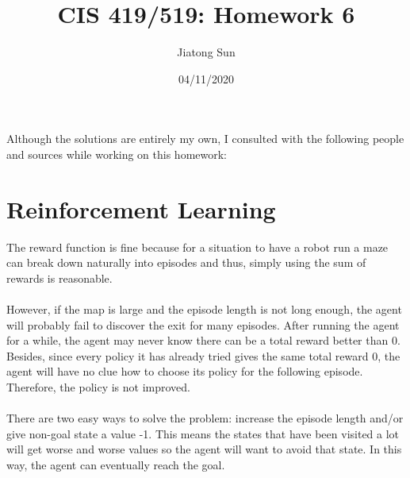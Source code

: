 \documentclass{article}
\title{CIS 419/519: Homework 6}
\author{Jiatong Sun}
\date{04/11/2020}
\begin{document}
    \maketitle
    \noindent
    Although the solutions are entirely my own, I consulted with the following people and sources while working on this homework: 
    
    \section{Reinforcement Learning \uppercase\expandafter{}}
    \noindent
    The reward function is fine because for a situation to have a robot run a maze can break down naturally into episodes and thus, simply using the sum of rewards is reasonable.\\\\
    However, if the map is large and the episode length is not long enough, the agent will probably fail to discover the exit for many episodes. After running the agent for a while, the agent may never know there can be a total reward better than 0. Besides, since every policy it has already tried gives the same total reward 0, the agent will have no clue how to choose its policy for the following episode. Therefore, the policy is not improved.\\\\
    There are two easy ways to solve the problem: increase the episode length and/or give non-goal state a value -1. This means the states that have been visited a lot will get worse and worse values so the agent will want to avoid that state. In this way, the agent can eventually reach the goal.
        
\end{document}
